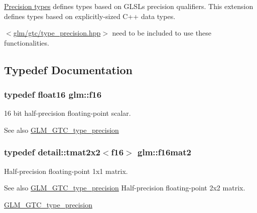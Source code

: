 \hyperlink{group__core__precision}{Precision types} defines types based on G\+L\+S\+L\textquotesingle{}s precision qualifiers. This extension defines types based on explicitly-\/sized C++ data types.

$<$\hyperlink{type__precision_8hpp}{glm/gtc/type\+\_\+precision.\+hpp}$>$ need to be included to use these functionalities. 

\subsection{Typedef Documentation}
\hypertarget{group__gtc__type__precision_ga55dd9f02a8b986348956057fd5f45c0d}{}
\subsubsection[{f16}]{\setlength{\rightskip}{0pt plus 5cm}typedef float16 {\bf glm\+::f16}}\label{group__gtc__type__precision_ga55dd9f02a8b986348956057fd5f45c0d}
16 bit half-\/precision floating-\/point scalar. \begin{DoxySeeAlso}{See also}
\hyperlink{group__gtc__type__precision}{G\+L\+M\+\_\+\+G\+T\+C\+\_\+type\+\_\+precision} 
\end{DoxySeeAlso}
\hypertarget{group__gtc__type__precision_gaa0e6cf15c6bf4136f596ed129a55ae6b}{}
\subsubsection[{f16mat2}]{\setlength{\rightskip}{0pt plus 5cm}typedef detail\+::tmat2x2$<$f16$>$ {\bf glm\+::f16mat2}}\label{group__gtc__type__precision_gaa0e6cf15c6bf4136f596ed129a55ae6b}
Half-\/precision floating-\/point 1x1 matrix. \begin{DoxySeeAlso}{See also}
\hyperlink{group__gtc__type__precision}{G\+L\+M\+\_\+\+G\+T\+C\+\_\+type\+\_\+precision} Half-\/precision floating-\/point 2x2 matrix. 

\hyperlink{group__gtc__type__precision}{G\+L\+M\+\_\+\+G\+T\+C\+\_\+type\+\_\+precision} 
\end{DoxySeeAlso}
\hypertarget{group__gtc__type__precision_ga1f4b12c53051603b62e6fa69e3b7a98b}{}
